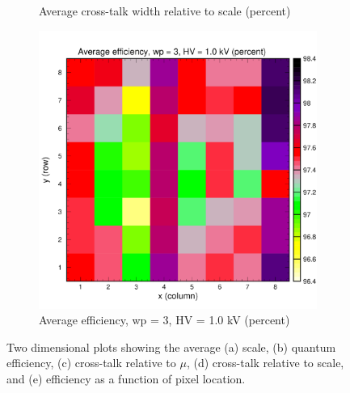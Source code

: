\begin{figure}[b]
\begin{subfigure}[c]{0.4\linewidth}
		\caption{Average cross-talk width relative to scale (percent)}
		\vspace{0mm}
	\end{subfigure}%
	\vspace{3mm}
	\begin{subfigure}[c]{0.4\linewidth}
		\centering
		\includegraphics[width=\linewidth, trim={0mm 0mm 0mm 19mm},clip]{figures/pglobal_eff2d.pdf}
		\caption{Average efficiency, wp = 3, HV = 1.0 kV (percent)}
		\vspace{0mm}
	\end{subfigure}%
	\caption{Two dimensional plots showing the average (a) scale, (b) quantum efficiency, (c) cross-talk relative to $\mu$, (d) cross-talk relative to scale, and (e) efficiency as a function of pixel location.}
	\label{fig:2d_avg_fit_results}
\end{figure}



